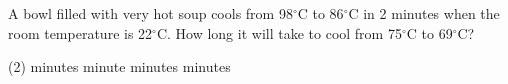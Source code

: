 \item A bowl filled with very hot soup cools from 98$^\circ$C to 86$^\circ$C in 2 minutes when the room temperature is 22$^\circ$C. How long it will take to cool from 75$^\circ$C to 69$^\circ$C?
    \begin{tasks}(2)
         minutes
         minute
         minutes
         minutes
    \end{tasks}